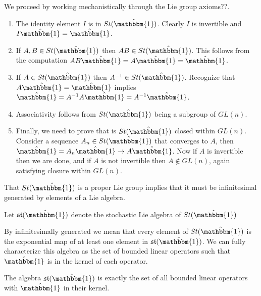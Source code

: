 \begin{IEEEproof}
	We proceed by working mechanistically through the Lie group axioms??.
	\begin{enumerate}
		\item The identity element $I$ is in $St(\hat{\mathbbm{1}})$. Clearly $I$ is
		invertible and $I \hat{\mathbbm{1}} = \hat{\mathbbm{1}}$.
		\item If $A,B \in St(\hat{\mathbbm{1}})$ then $AB \in St(\hat{\mathbbm{1}})$. 
		This follows from the computation $AB \hat{\mathbbm{1}} = A \hat{\mathbbm{1}} = \hat{\mathbbm{1}}$.
		\item If $A \in St(\hat{\mathbbm{1}})$ then $A^{-1} \in St(\hat{\mathbbm{1}})$.
		Recognize that $A \hat{\mathbbm{1}} = \hat{\mathbbm{1}}$ implies $\hat{\mathbbm{1}} = A^{-1} A \hat{\mathbbm{1}} = A^{-1} \hat{\mathbbm{1}}$.
		\item Associativity follows from $St(\hat{\mathbbm{1}})$ being a subgroup of $GL\left(n\right)$.
		\item Finally, we need to prove that is $St(\hat{\mathbbm{1}})$ closed 
		within $GL\left(n\right)$. Consider a sequence $A_n \in St(\hat{\mathbbm{1}})$ 
		that converges to $A$, then $\hat{\mathbbm{1}} = A_n \hat{\mathbbm{1}} \rightarrow A \hat{\mathbbm{1}}$. 
		Now if $A$ is invertible then we are done, and if $A$ is not invertible then 
		$A \notin GL\left(n\right)$, again satisfying closure within $GL\left(n\right)$.\hfill\IEEEQEDhere
	\end{enumerate}
\end{IEEEproof}

That $St(\hat{\mathbbm{1}})$ is a proper Lie group implies that it must be
infinitesimal generated by elements of a Lie algebra.

\begin{definition}
	Let $\mathfrak{st}(\hat{\mathbbm{1}})$ denote the stochastic Lie algebra of $St(\hat{\mathbbm{1}})$
\end{definition}

By infinitesimally generated we mean that every element of $St(\hat{\mathbbm{1}})$
is the exponential map of at least one element in $\mathfrak{st}(\hat{\mathbbm{1}})$. 
We can fully characterize this algebra as the set of bounded linear operators 
such that $\hat{\mathbbm{1}}$ is in the kernel of each operator.

\begin{lemma}
	The algebra $\mathfrak{st}(\hat{\mathbbm{1}})$ is exactly the set of all 
	bounded linear operators with $\hat{\mathbbm{1}}$ in their kernel.
\end{lemma}

